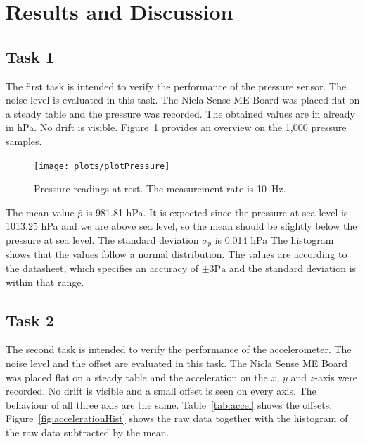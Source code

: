 \documentclass[DIV=14]{scrartcl}
\begin{document}
    \clearpage


    \section{Results and Discussion}

    \subsection*{Task 1}

    The first task is intended to verify the performance of the pressure sensor.
    The noise level is evaluated in this task.
    The Nicla Sense ME Board was placed flat on a steady table and the pressure was recorded.
    The obtained values are in already in \si{\hecto\pascal}.
    No drift is visible.
    Figure~\ref{fig:plotPressure} provides an overview on the 1,000 pressure samples.

    \begin{figure}[h]
        \centering
        \texttt{[image: plots/plotPressure]}
        \caption{Pressure readings at rest. The measurement rate is \SI{10}{\hertz}.}
        \label{fig:plotPressure}
    \end{figure}

    The mean value $\bar{p}$ is 981.81 \si{\hecto\pascal}.
    It is expected since the pressure at sea level is 1013.25 \si{\hecto\pascal} and we are above sea level,
    so the mean should be slightly below the pressure at sea level.
    The standard deviation $\sigma_p$ is 0.014 \si{\hecto\pascal}
    The histogram shows that the values follow a normal distribution.
    The values are according to the datasheet, which specifies an accuracy of $\pm3 \si{\pascal}$ and
    the standard deviation is within that range.

    \subsection*{Task 2}

    The second task is intended to verify the performance of the accelerometer.
    The noise level and the offset are evaluated in this task.
    The Nicla Sense ME Board was placed flat on a steady table and the acceleration on the $x$, $y$ and $z$-axis were recorded.
    No drift is visible and a small offset is seen on every axis.
    The behaviour of all three axis are the same.
    Table~\ref{tab:accel} shows the offsets.
    Figure~\ref{fig:accelerationHist} shows the raw data together with the histogram of the raw data subtracted by the mean.
\end{document}
